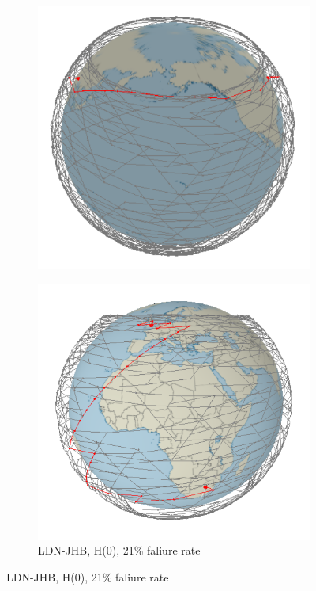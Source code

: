 \documentclass[12pt]{report}
\begin{document}
\begin{figure}
\begin{subfigure}[b]{0.4\textwidth}
		\includegraphics[width=\textwidth]{NewYorkBeijing1320SatellitesLM2}
	\end{subfigure}
	
	\begin{subfigure}[b]{\textwidth}
		\caption{LDN-JHB, H(0), 21\% faliure rate}
		\includegraphics[width=\textwidth]{LondonJohannasburg1254SatellitesLM2}
	\end{subfigure}
\end{figure}
\end{document}
